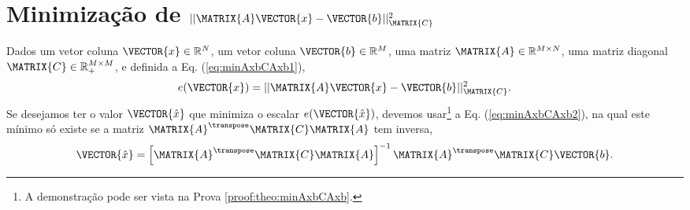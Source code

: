 \section{Minimização de $||\MATRIX{A}\VECTOR{x}-\VECTOR{b}||_{\MATRIX{C}}^2$}
\label{sec:minAxbCAxb}


\begin{theorem}\label{theo:minAxbCAxb}
Dados
um vetor coluna $\VECTOR{x}\in \mathbb{R}^N$, 
um vetor coluna $\VECTOR{b}\in \mathbb{R}^M$,  
uma matriz $\MATRIX{A} \in \mathbb{R}^{M\times N}$, 
uma matriz diagonal $\MATRIX{C} \in \mathbb{R}^{M\times M}_{+}$, e 
definida a Eq. (\ref{eq:minAxbCAxb1}),
\begin{equation}\label{eq:minAxbCAxb1}
e(\VECTOR{x})  = ||\MATRIX{A}\VECTOR{x}-\VECTOR{b}||_{\MATRIX{C}}^2.
\end{equation}
Se desejamos ter o valor $\VECTOR{\hat{x}}$ que minimiza o escalar $e(\VECTOR{\hat{x}})$,
devemos usar\footnote{A demonstração pode ser vista na Prova \ref{proof:theo:minAxbCAxb}.} a Eq. (\ref{eq:minAxbCAxb2}),
na qual este mínimo só existe se a matriz $\MATRIX{A}^{\transpose}\MATRIX{C} \MATRIX{A}$ tem inversa,
\begin{equation}\label{eq:minAxbCAxb2}
\VECTOR{\hat{x}} =
\left[ \MATRIX{A}^{\transpose}\MATRIX{C} \MATRIX{A} \right]^{-1}\MATRIX{A}^{\transpose}\MATRIX{C}\VECTOR{b}.
\end{equation}
\end{theorem}

